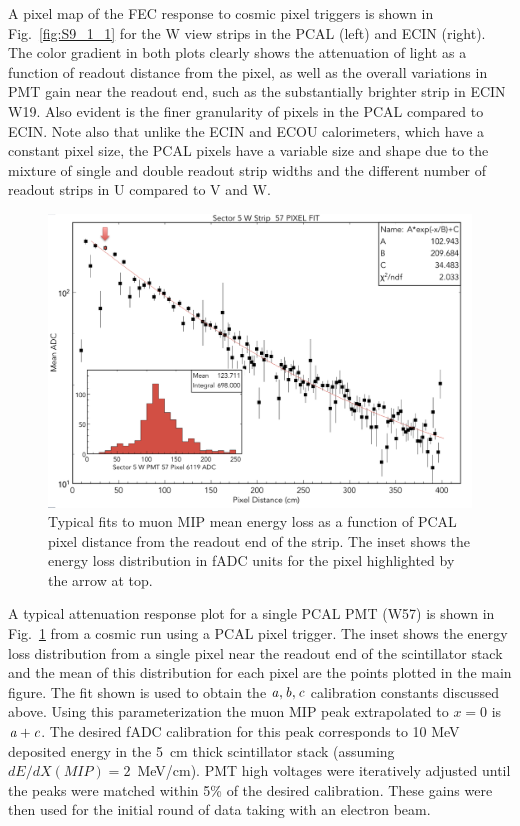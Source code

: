 A pixel map of the FEC response to cosmic pixel triggers is shown in Fig.~\ref{fig:S9_1_1} for the W view strips in the PCAL (left) and ECIN (right). The color gradient in both plots clearly shows the attenuation of light as a function of readout distance from the pixel, as well as the overall variations in PMT gain near the readout end, such as the substantially brighter strip in ECIN W19.  Also evident is the finer granularity of pixels in the PCAL compared to ECIN.  Note also that unlike the ECIN and ECOU calorimeters, which have a constant pixel size, the PCAL pixels have a variable size and shape due to the mixture of single and double readout strip widths and the different number of readout strips in U compared to V and W. 
\begin{figure}[hbt]
\centering
\includegraphics[width=1.0\columnwidth,keepaspectratio]{img/S9_1_2.png}
\caption[]{Typical fits to muon MIP mean energy loss as a function of PCAL pixel distance from the readout end of the strip. The inset shows the energy loss distribution in fADC units for the pixel highlighted by the arrow at top.}
\label{fig:S9_1_2}
\end{figure}

A typical attenuation response plot for a single PCAL PMT (W57) is shown in Fig.~\ref{fig:S9_1_2} from a cosmic run using a PCAL pixel trigger.  The inset shows the energy loss distribution from a single pixel near the readout end of the scintillator stack and the mean of this distribution for each pixel are the points plotted in the main figure.  The fit shown is used to obtain the $\it{a,b,c}$ calibration constants discussed above.  Using this parameterization the muon MIP peak extrapolated to $x=0$ is $\it{a+c}$.   The desired fADC calibration for this peak corresponds to 10 MeV deposited energy in the 5~cm thick scintillator stack (assuming $dE/dX(MIP)=2$~MeV/cm).  PMT high voltages were iteratively adjusted until the peaks were matched within 5\% of the desired calibration.   These gains were then used for the initial round of data taking with an electron beam.

